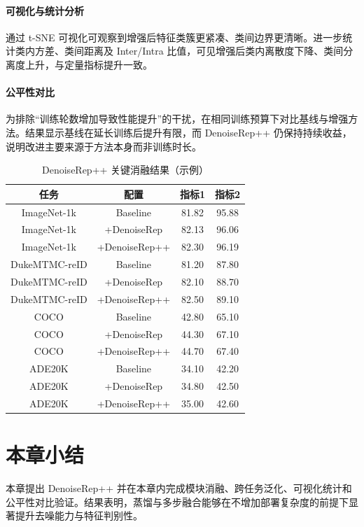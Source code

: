 \paragraph{可视化与统计分析} 通过 t-SNE 可视化可观察到增强后特征类簇更紧凑、类间边界更清晰。进一步统计类内方差、类间距离及 Inter/Intra 比值，可见增强后类内离散度下降、类间分离度上升，与定量指标提升一致。
\paragraph{公平性对比} 为排除“训练轮数增加导致性能提升”的干扰，在相同训练预算下对比基线与增强方法。结果显示基线在延长训练后提升有限，而 DenoiseRep++ 仍保持持续收益，说明改进主要来源于方法本身而非训练时长。

\begin{table}[!htb]
\centering
\caption{DenoiseRep++ 关键消融结果（示例）}
\label{tab:drpp-ablation}
\small
\begin{tabular}{|c|c|c|c|}
\hline
任务 & 配置 & 指标1 & 指标2 \\
\hline
ImageNet-1k & Baseline & 81.82 & 95.88 \\
ImageNet-1k & +DenoiseRep & 82.13 & 96.06 \\
ImageNet-1k & +DenoiseRep++ & 82.30 & 96.19 \\
\hline
DukeMTMC-reID & Baseline & 81.20 & 87.80 \\
DukeMTMC-reID & +DenoiseRep & 82.10 & 88.70 \\
DukeMTMC-reID & +DenoiseRep++ & 82.50 & 89.10 \\
\hline
COCO & Baseline & 42.80 & 65.10 \\
COCO & +DenoiseRep & 44.30 & 67.10 \\
COCO & +DenoiseRep++ & 44.70 & 67.40 \\
\hline
ADE20K & Baseline & 34.10 & 42.20 \\
ADE20K & +DenoiseRep & 34.80 & 42.50 \\
ADE20K & +DenoiseRep++ & 35.00 & 42.60 \\
\hline
\end{tabular}
\end{table}

\section{本章小结}
本章提出 DenoiseRep++ 并在本章内完成模块消融、跨任务泛化、可视化统计和公平性对比验证。结果表明，蒸馏与多步融合能够在不增加部署复杂度的前提下显著提升去噪能力与特征判别性。

